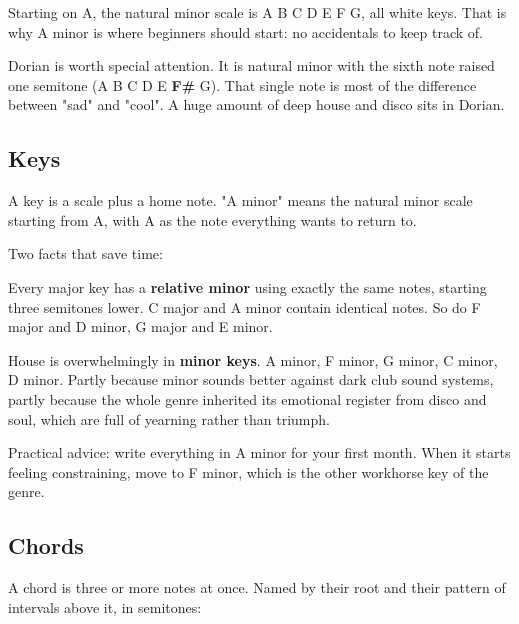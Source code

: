 Starting on A, the natural minor scale is A B C D E F G, all white keys. That is why A
minor is where beginners should start: no accidentals to keep track of.

Dorian is worth special attention. It is natural minor with the sixth note raised one
semitone (A B C D E \textbf{F\#} G). That single note is most of the difference between "sad" and
"cool". A huge amount of deep house and disco sits in Dorian.

\subsection{Keys}\label{th04_harmony-keys}

A key is a scale plus a home note. "A minor" means the natural minor scale starting from A,
with A as the note everything wants to return to.

Two facts that save time:

Every major key has a \textbf{relative minor} using exactly the same notes, starting three
semitones lower. C major and A minor contain identical notes. So do F major and D minor, G
major and E minor.

House is overwhelmingly in \textbf{minor keys}. A minor, F minor, G minor, C minor, D minor.
Partly because minor sounds better against dark club sound systems, partly because the whole
genre inherited its emotional register from disco and soul, which are full of yearning
rather than triumph.

Practical advice: write everything in A minor for your first month. When it starts feeling
constraining, move to F minor, which is the other workhorse key of the genre.

\subsection{Chords}\label{th04_harmony-chords}

A chord is three or more notes at once. Named by their root and their pattern of intervals
above it, in semitones:

